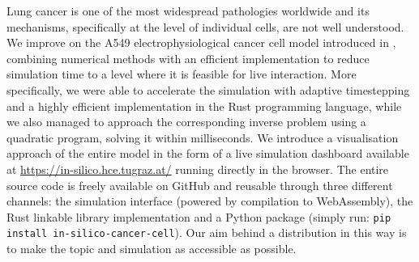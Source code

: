 Lung cancer is one of the most widespread pathologies worldwide and its mechanisms, specifically at the level of individual cells, are not well understood.
We improve on the A549 electrophysiological cancer cell model introduced in \cite{2021-A549-model,2024-calcium-channels}, combining numerical methods with an efficient implementation to reduce simulation time to a level where it is feasible for live interaction.
More specifically, we were able to accelerate the simulation with adaptive timestepping and a highly efficient implementation in the Rust programming language, while we also managed to approach the corresponding inverse problem using a quadratic program, solving it within milliseconds.
We introduce a visualisation approach of the entire model in the form of a live simulation dashboard available at \url{https://in-silico.hce.tugraz.at/} running directly in the browser.
The entire source code is freely available on GitHub and reusable through three different channels: the simulation interface (powered by compilation to WebAssembly), the Rust linkable library implementation and a Python package (simply run: \texttt{pip install in-silico-cancer-cell}).
Our aim behind a distribution in this way is to make the topic and simulation as accessible as possible.


